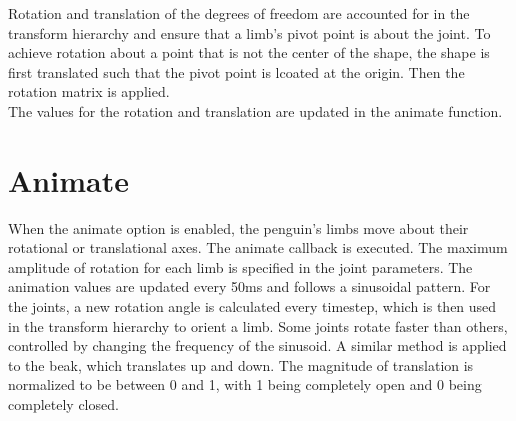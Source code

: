 \documentclass{scrartcl}
\begin{document}
Rotation and translation of the degrees of freedom are accounted for in the transform hierarchy and ensure that a limb's pivot point is about the joint. To achieve rotation about
a point that is not the center of the shape, the shape is first translated such that the pivot point is lcoated at the origin. Then the rotation matrix is applied.\\

The values for the rotation and translation are updated in the animate function.		\\

\section{Animate}


When the animate option is enabled, the penguin's limbs move about their rotational or translational axes. The animate callback is executed. The maximum amplitude of rotation
for each limb is specified in the joint parameters. The animation values are updated every 50ms and follows a sinusoidal pattern. For the joints, a new rotation angle is calculated
every timestep, which is then used in the transform hierarchy to orient a limb. Some joints rotate faster than others, controlled by changing the frequency of the sinusoid. 
A similar method is applied to the beak, which translates up and down. The magnitude of translation is normalized to be between 0 and 1, with 1 being completely open and 0 being completely closed.
\end{document}
